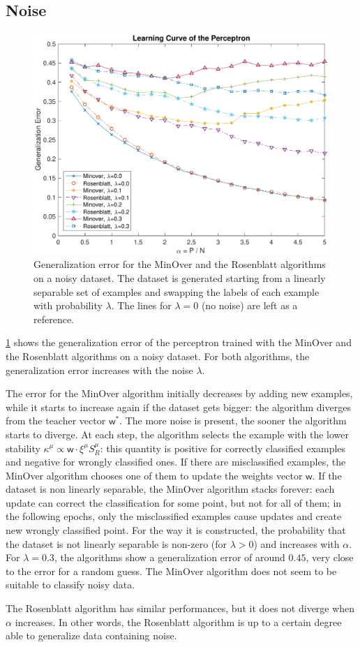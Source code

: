 \subsection{Noise}
\begin{figure}[t]
	\centering
	\includegraphics[width=\columnwidth]{figures/noise}
    \caption{Generalization error for the MinOver and the Rosenblatt algorithms on a noisy dataset. The dataset is generated starting from a linearly separable set of examples and swapping the labels of each example with probability $\lambda$. The lines for $\lambda = 0$ (no noise) are left as a reference.}
	\label{fig:noise}
\end{figure}

\cref{fig:noise} shows the generalization error of the perceptron trained with the MinOver and the Rosenblatt algorithms on a noisy dataset.
For both algorithms, the generalization error increases with the noise $\lambda$.

The error for the MinOver algorithm initially decreases by adding new examples, while it starts to increase again if the dataset gets bigger:
the algorithm diverges from the teacher vector $\bm{\mathsf{w}}^{*}$.
The more noise is present, the sooner the algorithm starts to diverge.
At each step, the algorithm selects the example with the lower stability $\kappa^\mu \propto \bm{\mathsf{w}} \cdotp \xi^\mu S^\mu_R$:
this quantity is positive for correctly classified examples and negative for wrongly classified ones.
If there are misclassified examples, the MinOver algorithm chooses one of them to update the weights vector $\bm{\mathsf{w}}$.
If the dataset is non linearly separable, the MinOver algorithm stacks forever:
each update can correct the classification for some point, but not for all of them;
in the following epochs, only the misclassified examples cause updates and create new wrongly classified point.
For the way it is constructed, the probability that the dataset is not linearly separable is non-zero (for $\lambda > 0$) and increases with $\alpha$.
For $\lambda = 0.3$, the algorithms show a generalization error of around $0.45$, very close to the error for a random guess.
The MinOver algorithm does not seem to be suitable to classify noisy data.

The Rosenblatt algorithm has similar performances, but it does not diverge when $\alpha$ increases.
In other words, the Rosenblatt algorithm is up to a certain degree able to generalize data containing noise.
